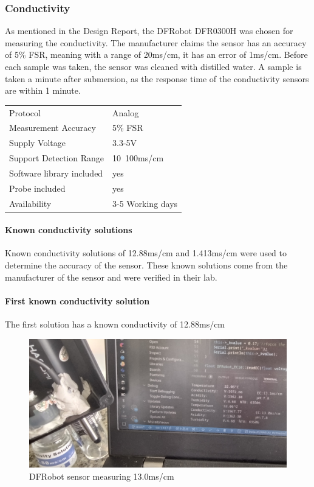 \newpage
\subsubsection{Conductivity}
As mentioned in the Design Report, the DFRobot DFR0300H \cite{DFR0300H} was chosen for measuring the conductivity. The manufacturer claims the sensor has an accuracy of 5\% \gls{FSR}, meaning with a range of 20\gls{ms}/\gls{cm}, it has an error of 1\gls{ms}/\gls{cm}. Before each sample was taken, the sensor was cleaned with distilled water. A sample is taken a minute after submersion, as the response time of the conductivity sensors are within 1 minute.

\begin{table}[h!]
	\centering
	\quad
	\begin{tabular}{| l | l |}
    \hline
    Protocol & Analog\\
    Measurement Accuracy &  5\% FSR\\
    Supply Voltage & 3.3-5V\\
    Support Detection Range & 10~100ms/cm\\
    Software library included & yes \\
    Probe included & yes \\
    Availability & 3-5 Working days \\
    \hline
	\end{tabular}
\end{table}

\paragraph{Known conductivity solutions}
Known conductivity solutions of 12.88\gls{ms}/\gls{cm} and 1.413\gls{ms}/\gls{cm} were used to determine the accuracy of the sensor. These known solutions come from the manufacturer of the sensor and were verified in their lab.

\newpage
\paragraph{First known conductivity solution}
The first solution has a known conductivity of 12.88\gls{ms}/\gls{cm}

\begin{figure}[h]
\centering
\includegraphics[scale=0.6]{080_testing/sensors/21_ec1288_dfrobot.jpg}
\caption{DFRobot sensor measuring 13.0\gls{ms}/\gls{cm}}
\end{figure}


